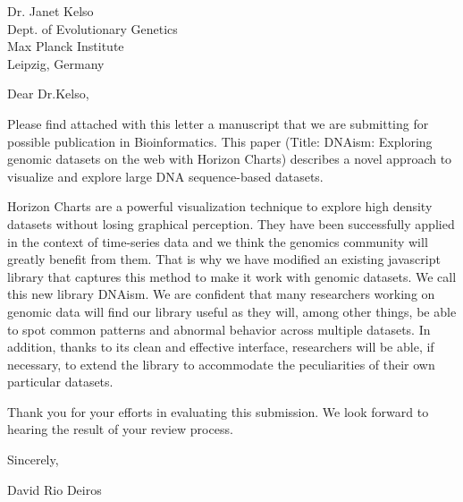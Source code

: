 \documentclass{letter}
\begin{document}
\begin{letter}{Dr. Janet Kelso \\
Dept. of Evolutionary Genetics \\
Max Planck Institute \\
Leipzig, Germany}


\opening{Dear Dr.Kelso,}

    Please find attached with this letter a manuscript that we are submitting
for possible publication in Bioinformatics.  This paper (Title: DNAism:
Exploring genomic datasets on the web with Horizon Charts) describes a novel
approach to visualize and explore large DNA sequence-based datasets.

Horizon Charts are a powerful visualization technique to explore high density
datasets without losing graphical perception. They have been successfully
applied in the context of time-series data and we think the genomics community
will greatly benefit from them. That is why we have modified an existing
javascript library that captures this method to make it work with genomic
datasets. We call this new library DNAism. We are confident that many
researchers working on genomic data will find our library useful as they will,
among other things, be able to spot common patterns and abnormal behavior
across multiple datasets. In addition, thanks to its clean and effective
interface, researchers will be able, if necessary, to extend the library to
accommodate the peculiarities of their own particular datasets.

Thank you for your efforts in evaluating this submission.  We look forward to
hearing the result of your review process.



\closing{Sincerely,}

David Rio Deiros
\end{letter}
\end{document}
